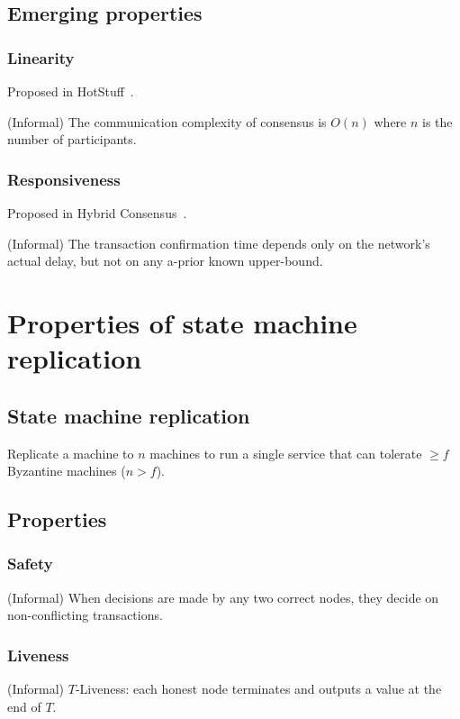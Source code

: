 \documentclass[runningheads]{llncs}
\begin{document}
\subsection{Emerging properties}

\subsubsection{Linearity}
Proposed in HotStuff~\cite{yin2019hotstuff}.

(Informal) The communication complexity of consensus is $O(n)$ where $n$ is the number of participants.

\subsubsection{Responsiveness}
Proposed in Hybrid Consensus~\cite{pass2017hybrid}.

(Informal) The transaction confirmation time depends only on the network’s actual delay, but not on any a-prior known upper-bound.




\section{Properties of state machine replication}

\subsection{State machine replication}
Replicate a machine to $n$ machines to run a single service that can tolerate $\geq f$ Byzantine machines ($n > f$).

\subsection{Properties}

\subsubsection{Safety}
(Informal) When decisions are made by any two correct nodes, they decide on non-conflicting transactions.

\subsubsection{Liveness}
(Informal) $T$-Liveness: each honest node terminates and outputs a value at the end of $T$.
\end{document}
